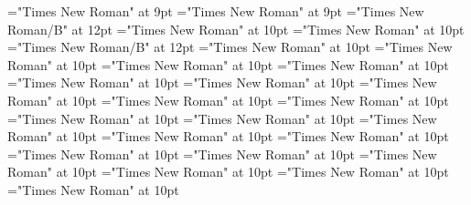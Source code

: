 \documentclass[gps1,twoside]{article}
\begin{document}
\font\captionpicturepicturessubentrysubentriesentrybefore="Times New Roman" at 9pt
\font\subentriessubentrysubentriesentryafter="Times New Roman" at 9pt
\font\spanbzhheadwordminorentrycomplex="Times New Roman/B" at 12pt
\font\headwordminorentrycomplexbefore="Times New Roman" at 10pt
\font\spanheadwordminorentrycomplexlastchildafter="Times New Roman" at 10pt
\font\spanheadwordminorentrycomplex="Times New Roman/B" at 12pt
\font\pronunciationpronunciationpronunciationsminorentrycomplexbefore="Times New Roman" at 10pt
\font\pronunciationsminorentrycomplexafter="Times New Roman" at 10pt
\font\formpronunciationpronunciationsminorentrycomplexbefore="Times New Roman" at 10pt
\font\spanformpronunciationpronunciationsminorentrycomplexfirstchildbefore="Times New Roman" at 10pt
\font\spanformpronunciationpronunciationsminorentrycomplexlastchildafter="Times New Roman" at 10pt
\font\variantformentrybackrefsminorentrycomplexbefore="Times New Roman" at 10pt
\font\variantformentrybackrefsminorentrycomplexafter="Times New Roman" at 10pt
\font\variantentrytypevariantentrytypevariantentrytypesvariantformentrybackrefvariantformentrybackrefsminorentrycomplexbefore="Times New Roman" at 10pt
\font\variantentrytypesvariantformentrybackrefvariantformentrybackrefsminorentrycomplexafter="Times New Roman" at 10pt
\font\reverseabbrvariantentrytypevariantentrytypesvariantformentrybackrefvariantformentrybackrefsminorentrycomplexbefore="Times New Roman" at 10pt
\font\spanreverseabbrvariantentrytypevariantentrytypesvariantformentrybackrefvariantformentrybackrefsminorentrycomplexlastchildafter="Times New Roman" at 10pt
\font\headwordvariantformentrybackrefvariantformentrybackrefsminorentrycomplexbefore="Times New Roman" at 10pt
\font\owningentrysummarydefinitionvariantformentrybackrefvariantformentrybackrefsminorentrycomplexbefore="Times New Roman" at 10pt
\font\spanowningentrysummarydefinitionvariantformentrybackrefvariantformentrybackrefsminorentrycomplexlastchildafter="Times New Roman" at 10pt
\font\visiblevariantentryrefsminorentrycomplexbefore="Times New Roman" at 10pt
\font\visiblevariantentryrefsminorentrycomplexafter="Times New Roman" at 10pt
\font\variantentrytypevariantentrytypevariantentrytypesvisiblevariantentryrefvisiblevariantentryrefsminorentrycomplexbefore="Times New Roman" at 10pt
\font\variantentrytypesvisiblevariantentryrefvisiblevariantentryrefsminorentrycomplexafter="Times New Roman" at 10pt
\font\abbreviationvariantentrytypevariantentrytypesvisiblevariantentryrefvisiblevariantentryrefsminorentrycomplexbefore="Times New Roman" at 10pt
\font\spanabbreviationvariantentrytypevariantentrytypesvisiblevariantentryrefvisiblevariantentryrefsminorentrycomplexlastchildafter="Times New Roman" at 10pt
\end{document}
